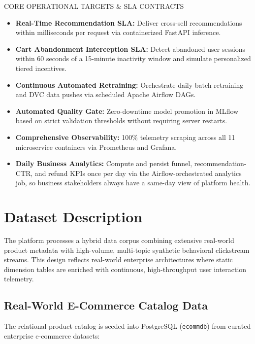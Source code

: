 \documentclass[11pt,a4paper]{article}
\begin{document}
\begin{calloutbox}{CORE OPERATIONAL TARGETS \& SLA CONTRACTS}
\begin{itemize}
    \item \textbf{Real-Time Recommendation SLA:} Deliver cross-sell recommendations within milliseconds per request via containerized FastAPI inference.
    \item \textbf{Cart Abandonment Interception SLA:} Detect abandoned user sessions within 60 seconds of a 15-minute inactivity window and simulate personalized tiered incentives.
    \item \textbf{Continuous Automated Retraining:} Orchestrate daily batch retraining and DVC data pushes via scheduled Apache Airflow DAGs.
    \item \textbf{Automated Quality Gate:} Zero-downtime model promotion in MLflow based on strict validation thresholds without requiring server restarts.
    \item \textbf{Comprehensive Observability:} 100\% telemetry scraping across all 11 microservice containers via Prometheus and Grafana.
    \item \textbf{Daily Business Analytics:} Compute and persist funnel, recommendation-CTR, and refund KPIs once per day via the Airflow-orchestrated analytics job, so business stakeholders always have a same-day view of platform health.
\end{itemize}
\end{calloutbox}

\section{Dataset Description}

The platform processes a hybrid data corpus combining extensive real-world product metadata with high-volume, multi-topic synthetic behavioral clickstream streams. This design reflects real-world enterprise architectures where static dimension tables are enriched with continuous, high-throughput user interaction telemetry.

\subsection{Real-World E-Commerce Catalog Data}
The relational product catalog is seeded into PostgreSQL (\texttt{ecommdb}) from curated enterprise e-commerce datasets:
\end{document}
